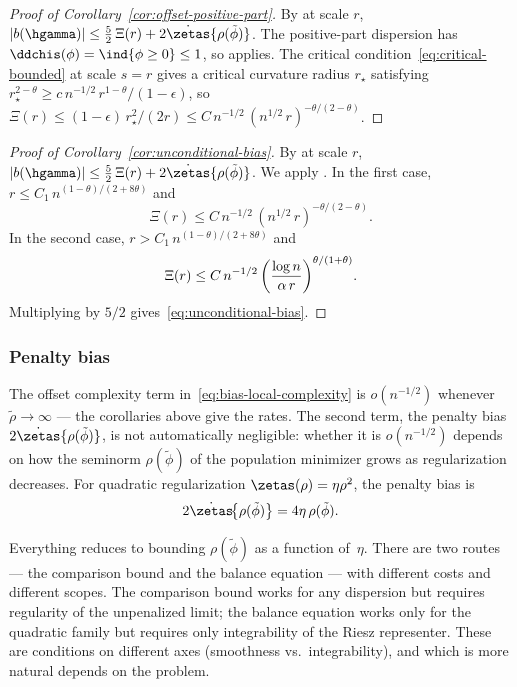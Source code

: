 \documentclass{article}
\begin{document}
\begin{proof}[Proof of Corollary~\ref{cor:offset-positive-part}]
By  at scale $r$,
$|b(\hgamma)|
  \le \tfrac{5}{2}\,\Xi(r)
  + 2\dot\zetas\{\rho(\tilde\phi)\}$.
The positive-part dispersion has
$\ddchis(\phi) = \ind{\phi \ge 0} \le 1$,
so 
applies.
The critical condition~\eqref{eq:critical-bounded}
at scale $s = r$
gives a critical curvature radius $r_\star$ satisfying
$r_\star^{2-\theta}
  \ge c\, n^{-1/2}\, r^{1-\theta} / (1-\epsilon)$,
so
$\Xi(r)
  \le (1-\epsilon)\, r_\star^2/(2r)
  \le C\, n^{-1/2}\, (n^{1/2}\, r)^{-\theta/(2-\theta)}$.
\end{proof}

\begin{proof}[Proof of Corollary~\ref{cor:unconditional-bias}]
By  at scale $r$,
$|b(\hgamma)|
  \le \tfrac{5}{2}\, \Xi(r)
  + 2\dot\zetas\{\rho(\tilde\phi)\}$.
We apply
.
In the first case,
$r \le C_1\, n^{(1-\theta)/(2+8\theta)}$
and
\[
\Xi(r)
  \le C\, n^{-1/2}\, (n^{1/2}\, r)^{-\theta/(2-\theta)}.
\]
In the second case,
$r > C_1\, n^{(1-\theta)/(2+8\theta)}$
and
\[
\Xi(r)
  \le C\, n^{-1/2}\,
  \qty(\frac{\log n}{\alpha\, r})^{\theta/(1+\theta)}.
\]
Multiplying by $5/2$
gives~\eqref{eq:unconditional-bias}.
\end{proof}

\subsubsection{Penalty bias}
\label{sec:penalty-bias}

The offset complexity term
in~\eqref{eq:bias-local-complexity}
is $o(n^{-1/2})$
whenever $\tilde\rho \to \infty$
--- the corollaries above give the rates.
The second term,
the penalty bias $2\dot\zetas\{\rho(\tilde\phi)\}$,
is not automatically negligible:
whether it is $o(n^{-1/2})$ depends on
how the seminorm $\rho(\tilde\phi)$
of the population minimizer grows
as regularization decreases.
For quadratic regularization
$\zetas(\rho) = \eta\rho^2$,
the penalty bias is
\[
2\dot\zetas\!\qty{\rho(\tilde\phi)}
  = 4\eta\,\rho(\tilde\phi).
\]

Everything reduces to bounding
$\rho(\tilde\phi)$ as a function of~$\eta$.
There are two routes
--- the comparison bound and the balance equation ---
with different costs and different scopes.
The comparison bound works for any dispersion
but requires regularity of the unpenalized limit;
the balance equation works only
for the quadratic family
but requires only integrability
of the Riesz representer.
These are conditions on different axes
(smoothness vs.\ integrability),
and which is more natural depends on the problem.
\end{document}
